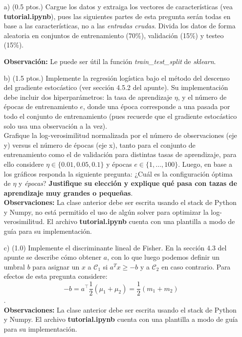 \documentclass[11pt,letterpaper]{article}
\begin{document}
\begin{enumerate}

\item[a)](0.5 ptos.) Cargue los datos y extraiga los vectores de características (vea \textbf{tutorial.ipynb}), pues las siguientes partes de esta pregunta serán todas en base a las características, no a las  \emph{entradas crudas}. Divida los datos de forma aleatoria en conjuntos de entrenamiento (70\%), validación (15\%) y testeo (15\%). 

\textbf{Observación:} Le puede ser útil la función \textit{train\_test\_split} de \textit{sklearn}.

\item[b)] (1.5 ptos.) Implemente la regresión logística bajo el método del descenso del gradiente estocástico (ver sección 4.5.2 del apunte). Su implementación debe incluir dos hiperparámetros:  la tasa de aprendizaje $\eta$, y el número de épocas de entrenamiento $e$, donde una época corresponde a una pasada por todo el conjunto de entrenamiento (pues recuerde que el gradiente estocástico solo usa una observación a la vez).  \\
Grafique la log-verosimilitud normalizada por el número de observaciones (eje y) versus el número de épocas (eje x), tanto para el conjunto de entrenamiento como el de validación para distintas tasas de aprendizaje, para ello considere $\eta \in  \{0.01, 0.05, 0.1\}$ y {épocas} $e\in \{1,\ldots, 100\}$. Luego, en base a los gráficos responda la siguiente pregunta:
¿Cuál es la configuración óptima de $\eta$ y \textit{épocas}? \textbf{Justifique su elección y explique qué pasa con tazas de aprendizaje muy grandes o pequeñas}.\\
\textbf{Observaciones:} La clase anterior debe ser escrita usando el stack de Python y Numpy, no está permitido el uso de algún solver para optimizar la log-verosimilitud. El archivo \textbf{tutorial.ipynb} cuenta con una plantilla a modo de guía para su implementación.

\item [c)] (1.0) Implemente el discriminante lineal de Fisher. En la sección 4.3 del apunte se describe cómo obtener $a$, con lo que luego podemos definir un umbral $b$ para asignar un $x$ a $\mathcal{C}_{1}$ si $a^{T}x\geq-b$ y a $\mathcal{C}_{2}$ en caso contrario. Para efectos de esta pregunta considere:
\begin{equation*}
    -b=a^{\top}\frac{1}{2}(\mu_{1}+\mu_{2})=\frac{1}{2}(m_{1}+m_{2})
\end{equation*}.\\ 
\textbf{Observaciones:} La clase anterior debe ser escrita usando el stack de Python y Numpy. El archivo \textbf{tutorial.ipynb} cuenta con una plantilla a modo de guía para su implementación. 


\end{enumerate}
\end{document}

